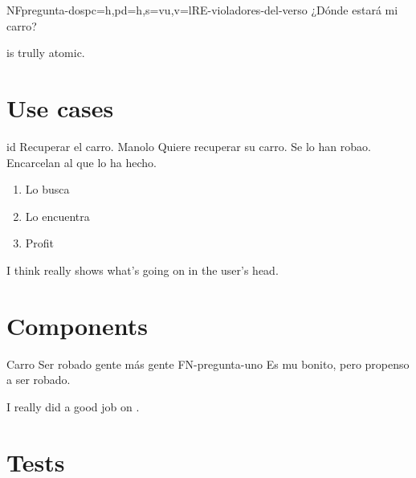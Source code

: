 \documentclass[a4paper,10pt]{article}
\begin{document}
  \begin{softwareReq}{NF}{pregunta-dos}{pc=h,pd=h,s=vu,v=l}{RE-violadores-del-verso}
    ¿Dónde estará mi carro?
  \end{softwareReq}

  \FloatBarrier


   is trully atomic.


  \section{Use cases}

  \printuctemplate

  \begin{useCase}{id}
    {Recuperar el carro.}  %
    {Manolo}  %
    {Quiere recuperar su carro.}  %
    {Se lo han robao.}  %
    {Encarcelan al que lo ha hecho.}  %
    \begin{enumerate}  %
      \item Lo busca
      \item Lo encuentra
      \item Profit
    \end{enumerate}
  \end{useCase}

  I think  really shows what's going on in the user's head.

  \FloatBarrier



  \section{Components}

  \printcomptemplate

  \begin{component}{Carro}
    {Ser robado}  %
    {\NA}  %
    {gente}  %
    {más gente}  %
    {FN-pregunta-uno}  %
    Es mu bonito, pero propenso a ser robado.
  \end{component}

  I really did a good job on .

  \FloatBarrier



  \section{Tests}
\end{document}
